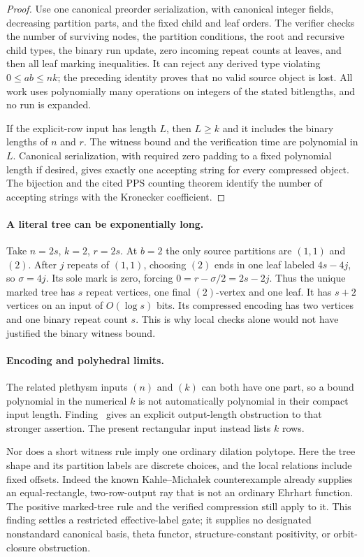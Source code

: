 \begin{proof}
Use one canonical preorder serialization, with canonical integer
fields, decreasing partition parts, and the fixed child and leaf
orders. The verifier checks the number of surviving nodes, the
partition conditions, the root and recursive child types, the
binary run update, zero incoming repeat counts at leaves, and
then all leaf marking inequalities.
It can reject any derived type violating $0\le ab\le nk$;
the preceding identity proves that no valid source object is lost.
All work uses polynomially many operations on integers of the
stated bitlengths, and no run is expanded.

If the explicit-row input has length $L$, then $L\ge k$ and it
includes the binary lengths of $n$ and $r$. The witness bound and
the verification time are polynomial in $L$. Canonical serialization,
with required zero padding to a fixed polynomial length if desired,
gives exactly one accepting string for every compressed object.
The bijection and the cited PPS counting theorem identify the
number of accepting strings with the Kronecker coefficient.
\end{proof}

\paragraph{A literal tree can be exponentially long.}
Take $n=2s$, $k=2$, $r=2s$. At $b=2$ the only source partitions
are $(1,1)$ and $(2)$. After $j$ repeats of $(1,1)$, choosing $(2)$
ends in one leaf labeled $4s-4j$, so $\sigma=4j$.
Its sole mark is zero, forcing $0=r-\sigma/2=2s-2j$.
Thus the unique marked tree has $s$ repeat vertices, one final
$(2)$-vertex and one leaf. It has $s+2$ vertices on an input of
$O(\log s)$ bits. Its compressed encoding has two vertices and
one binary repeat count $s$. This is why local checks alone would
not have justified the binary witness bound.

\paragraph{Encoding and polyhedral limits.}
The related plethysm inputs $(n)$ and $(k)$ can both have one part,
so a bound polynomial in the numerical $k$ is not automatically
polynomial in their compact input length. Finding~ gives
an explicit output-length obstruction to that stronger assertion.
The present rectangular input instead lists $k$ rows.

Nor does a short witness rule imply one ordinary dilation polytope.
Here the tree shape and its partition labels are discrete choices,
and the local relations include fixed offsets. Indeed the known
Kahle--Micha{\l}ek counterexample
\cite[Theorem~5 and Remark~6, p.~4; rectangular identification, p.~6]{KM}
already supplies an equal-rectangle, two-row-output ray that is
not an ordinary Ehrhart function. The positive marked-tree rule
and the verified compression still apply to it.
This finding settles a restricted effective-label gate; it supplies
no designated nonstandard canonical basis, theta functor,
structure-constant positivity, or orbit-closure obstruction.

